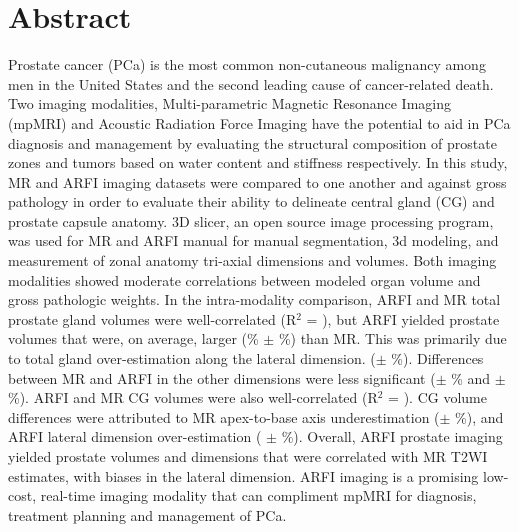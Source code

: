\section*{Abstract}
Prostate cancer (PCa) is the most common non-cutaneous malignancy among men in
the United States and the second leading cause of cancer-related death.
Two imaging modalities, Multi-parametric Magnetic Resonance Imaging (mpMRI) and
Acoustic Radiation Force Imaging have the potential to aid in PCa
diagnosis and management by evaluating the structural composition of prostate
zones and tumors based on water content and stiffness respectively.  In this study, 
MR and ARFI imaging datasets were compared to one another and against gross pathology in order to evaluate their
ability to delineate central gland (CG) and prostate capsule anatomy. 3D slicer, an open source image processing program,  was used for MR and ARFI manual
 for manual segmentation, 3d modeling, and measurement of zonal anatomy tri-axial dimensions and volumes.   
 Both imaging modalities showed moderate correlations between
modeled organ volume and gross pathologic weights.  In the intra-modality comparison,
ARFI and MR total prostate gland volumes were well-correlated (R$^2$ = \MRarfiVolTotalRsq), but
ARFI yielded prostate volumes that were, on average, larger
(\MRarfiVolTotalMeanDiff\% $\pm$ \MRarfiVolTotalStdDiff\%) than MR. This was
primarily due to total gland over-estimation along the lateral dimension.
(\ARFImrTotalLatLatMeanPct $\pm$ \ARFImrTotalLatLatStdPct\%). Differences between MR and
ARFI in the other dimensions were less significant (\ARFImrTotalAntPostMeanPct $\pm$
\ARFImrTotalAntPostStdPct\% and \ARFImrTotalApexBaseMeanPct $\pm$
\ARFImrTotalApexBaseStdPct\%). ARFI and MR CG volumes were also
well-correlated (R$^2$ = \MRarfiVolCentralRsq).  CG volume differences were
attributed to MR apex-to-base axis underestimation 
(\ARFImrCentralApexBaseMeanPct $\pm$ \ARFImrCentralApexBaseStdPct\%), and
ARFI lateral dimension over-estimation  (\ARFImrCentralLatLatMeanPct
$\pm$ \ARFImrCentralLatLatStdPct\%).  Overall, ARFI prostate imaging yielded prostate
volumes and dimensions that were correlated with MR T2WI estimates, with biases
in the lateral dimension. ARFI imaging is a promising low-cost, real-time imaging
modality that can compliment mpMRI for diagnosis, treatment planning and
management of PCa.


